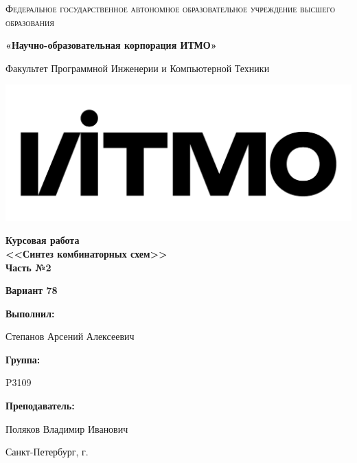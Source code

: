 \documentclass[12pt,a4paper]{report}
\makeatletter
\newcommand{\mathleft}{\@fleqntrue\@mathmargin0pt}
\makeatother
\begin{document}
\begin{titlepage}
	\centering
	{
        \scshape
        Федеральное государственное автономное образовательное учреждение высшего образования
        \par
        \textbf{«Научно-образовательная корпорация ИТМО»}
        \par
        \vspace*{1cm}
        Факультет Программной Инженерии и Компьютерной Техники
        \par
    }
    \vspace*{0.6cm}
    \includegraphics[width=\textwidth]{logo.png}
    {
        \Large
        \textbf{Курсовая работа\\ <<Синтез комбинаторных схем>>\\ Часть №2}
        \par 
        \normalsize
        \vspace*{0.75cm}
        \textbf{Вариант 78}
        \par
    }
    \vfill
    \hfill\begin{minipage}{\dimexpr\textwidth-7.8cm}
        \textbf{Выполнил:}\par
        Степанов Арсений Алексеевич\par
        \vspace*{0.15cm}
        \textbf{Группа:}\par
        P3109\par
        \vspace*{0.15cm}
        \textbf{Преподаватель:}\par
        Поляков Владимир Иванович\par
    \end{minipage}
    \vfill
    Санкт-Петербург, \the\year{}г. 
\end{titlepage}
\onehalfspacing
\mathleft
\end{document}
